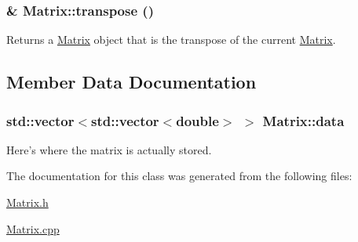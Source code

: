 \hypertarget{class_matrix_ad609fedfd61e93679803bb114e544569}{
\subsubsection[{transpose}]{ \& Matrix::transpose ()}}
\label{class_matrix_ad609fedfd61e93679803bb114e544569}


Returns a \hyperlink{class_matrix}{Matrix} object that is the transpose of the current \hyperlink{class_matrix}{Matrix}. 



\subsection{Member Data Documentation}
\hypertarget{class_matrix_adab4557133e13b08ae470a8e5df7b99c}{
\subsubsection[{data}]{\setlength{\rightskip}{0pt plus 5cm}std::vector$<$std::vector$<$double$>$ $>$ {\bf Matrix::data}}}
\label{class_matrix_adab4557133e13b08ae470a8e5df7b99c}


Here's where the matrix is actually stored. 



The documentation for this class was generated from the following files:\begin{DoxyCompactItemize}
\item 
\hyperlink{_matrix_8h}{Matrix.h}\item 
\hyperlink{_matrix_8cpp}{Matrix.cpp}\end{DoxyCompactItemize}
